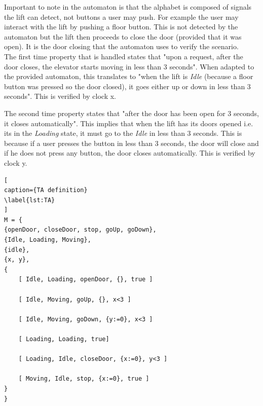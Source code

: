 \documentclass[a4paper, 12pt]{article}
\begin{document}
Important to note in the automaton is that the alphabet is composed of signals the lift can detect, not buttons a user may push. For example the user may interact with the lift by pushing a floor button. This is not detected by the automaton but the lift then proceeds to close the door (provided that it was open). It is the door closing that the automaton uses to verify the scenario. \\

The first time property that is handled states that "upon a request, after the door closes, the elevator starts moving in less than 3 seconds". When adapted to the provided automaton, this translates to "when the lift is \textit{Idle} (because a floor button was pressed so the door closed), it goes either up or down in less than 3 seconds". This is verified by clock x.

The second time property states that "after the door has been open for 3 seconds, it closes automatically". This implies that when the lift has its doors opened i.e. its in the \textit{Loading} state, it must go to the \textit{Idle} in less than 3 seconds. This is because if a user presses the button in less than 3 seconds, the door will close and if he does not press any button, the door closes automatically. This is verified by clock y. 

\begin{lstlisting}[
caption={TA definition}
\label{lst:TA}
]
M = {
{openDoor, closeDoor, stop, goUp, goDown},
{Idle, Loading, Moving},
{idle},
{x, y},
{
    [ Idle, Loading, openDoor, {}, true ]
    
    [ Idle, Moving, goUp, {}, x<3 ]
    
    [ Idle, Moving, goDown, {y:=0}, x<3 ]
    
    [ Loading, Loading, true]
    
    [ Loading, Idle, closeDoor, {x:=0}, y<3 ]
    
    [ Moving, Idle, stop, {x:=0}, true ]
}
}
\end{lstlisting}
\end{document}
